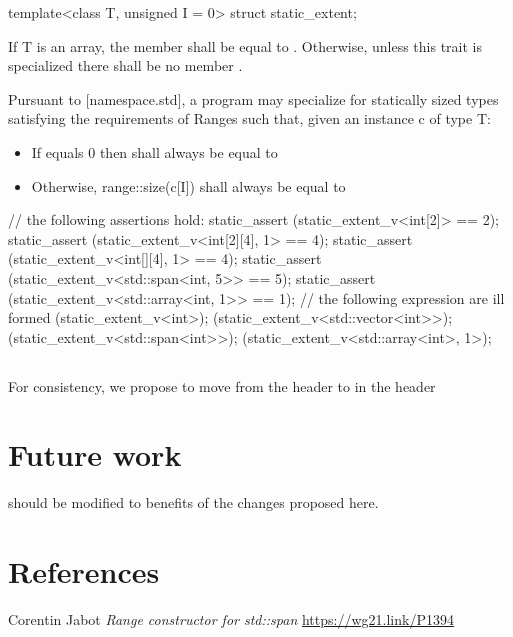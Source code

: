 \documentclass{wg21}
\begin{document}
\begin{itemdecl}
template<class T, unsigned I = 0>
struct static_extent;
\end{itemdecl}
\begin{itemdescr}
	\pnum
	If T is an array, the member  shall be equal to .
	Otherwise, unless this trait is specialized there shall be no member .
	
	Pursuant to [namespace.std], a program may specialize  for statically sized types satisfying the requirements of Ranges
	such that, given an instance c of type T:
		\begin{itemize}
			\item If  equals 0 then  shall always be equal to 
			\item Otherwise, range::size(c[I]) shall always be equal to 
		\end{itemize}
	\pagebreak
	\begin{example}
	\begin{codeblock}
	// the following assertions hold:
	static_assert (static_extent_v<int[2]> == 2);
	static_assert (static_extent_v<int[2][4], 1> == 4);
	static_assert (static_extent_v<int[][4], 1> == 4);
	static_assert (static_extent_v<std::span<int, 5>> == 5);
	static_assert (static_extent_v<std::array<int, 1>> == 1);
	// the following expression are ill formed
	(static_extent_v<int>);
	(static_extent_v<std::vector<int>>);
	(static_extent_v<std::span<int>>);
	(static_extent_v<std::array<int>, 1>);		
\end{codeblock}
	\end{example}
\end{itemdescr}

\subsection{}

For consistency, 
we propose to move  from the header  \linebreak
to  in the header 

\section{Future work}

 should be modified to benefits of the changes proposed here.

\section{References}
\renewcommand{\section}[2]{}%
\begin{thebibliography}{9}
	Corentin Jabot
	\emph{Range constructor for std::span}\newline
	\url{https://wg21.link/P1394}
\end{thebibliography}
\end{document}
